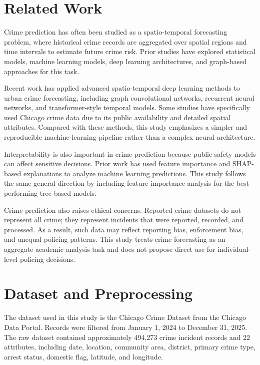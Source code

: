 \documentclass[conference]{IEEEtran}
\begin{document}
\section{Related Work}

Crime prediction has often been studied as a spatio-temporal forecasting problem, where historical crime records are aggregated over spatial regions and time intervals to estimate future crime risk. Prior studies have explored statistical models, machine learning models, deep learning architectures, and graph-based approaches for this task.

Recent work has applied advanced spatio-temporal deep learning methods to urban crime forecasting, including graph convolutional networks, recurrent neural networks, and transformer-style temporal models. Some studies have specifically used Chicago crime data due to its public availability and detailed spatial attributes. Compared with these methods, this study emphasizes a simpler and reproducible machine learning pipeline rather than a complex neural architecture.

Interpretability is also important in crime prediction because public-safety models can affect sensitive decisions. Prior work has used feature importance and SHAP-based explanations to analyze machine learning predictions. This study follows the same general direction by including feature-importance analysis for the best-performing tree-based models.

Crime prediction also raises ethical concerns. Reported crime datasets do not represent all crime; they represent incidents that were reported, recorded, and processed. As a result, such data may reflect reporting bias, enforcement bias, and unequal policing patterns. This study treats crime forecasting as an aggregate academic analysis task and does not propose direct use for individual-level policing decisions.

\section{Dataset and Preprocessing}

The dataset used in this study is the Chicago Crime Dataset from the Chicago Data Portal. Records were filtered from January 1, 2024 to December 31, 2025. The raw dataset contained approximately 494,273 crime incident records and 22 attributes, including date, location, community area, district, primary crime type, arrest status, domestic flag, latitude, and longitude.
\end{document}
